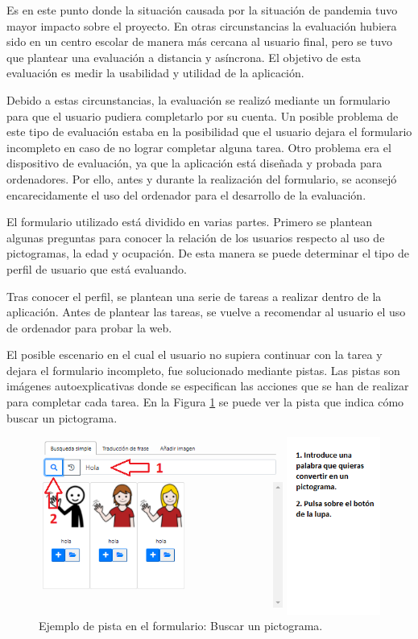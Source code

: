 Es en este punto donde la situación causada por la situación de pandemia tuvo mayor impacto sobre el proyecto. En otras circunstancias la evaluación hubiera sido en un centro escolar de manera más cercana al usuario final, pero se tuvo que plantear una evaluación a distancia y asíncrona. El objetivo de esta evaluación es medir la usabilidad y utilidad de la aplicación. 


Debido a estas circunstancias, la evaluación se realizó mediante un formulario para que el usuario pudiera completarlo por su cuenta. Un posible problema de este tipo de evaluación estaba en la posibilidad que el usuario dejara el formulario incompleto en caso de no lograr completar alguna tarea. Otro problema era el dispositivo de evaluación, ya que la aplicación está diseñada y probada para ordenadores. Por ello, antes y durante la realización del formulario, se aconsejó encarecidamente el uso del ordenador para el desarrollo de la evaluación.

El formulario utilizado está dividido en varias partes. Primero se plantean algunas preguntas para conocer la relación de los usuarios respecto al uso de pictogramas, la edad y ocupación. De esta manera se puede determinar el tipo de perfil de usuario que está evaluando.

Tras conocer el perfil, se plantean una serie de tareas a realizar dentro de la aplicación. Antes de plantear las tareas, se vuelve a recomendar al usuario el uso de ordenador para probar la web. 

El  posible escenario en el cual el usuario no supiera continuar con la tarea y dejara el formulario incompleto, fue solucionado mediante pistas. Las pistas son imágenes autoexplicativas donde se especifican las acciones que se han de realizar para completar cada tarea. En la Figura \ref{fig:evaPista} se puede ver la pista que indica cómo buscar un pictograma.

\begin{figure}[h!]
	\centering
	\includegraphics[width=0.8\linewidth]{Imagenes/Bitmap/evaluacionPista}
	\caption{ Ejemplo de pista en el formulario: Buscar un pictograma.
	}
	\label{fig:evaPista}
\end{figure} 

